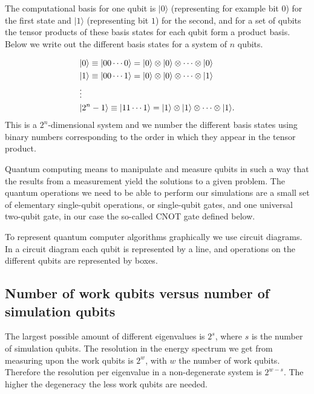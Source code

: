 \documentclass[%
oneside,                 %
final,                   %
10pt]{article}
\begin{document}
The computational basis for one qubit is ${\ensuremath{\vert 0 \rangle}}$ (representing for example bit $0$) 
for the first state
and ${\ensuremath{|1\rangle}}$ (representing bit $1$) for the second, and for a set of qubits  
the tensor products of
these basis states for each qubit form a product basis. Below we write out the different
basis states for a system of $n$ qubits.

\begin{align}
\label{eq:compBasis}
&{\ensuremath{\vert 0 \rangle}} \equiv {\ensuremath{\vert 00\cdots 0 \rangle}} =
      {\ensuremath{\vert 0 \rangle}} \otimes {\ensuremath{| 0 \rangle}} \otimes
          \cdots 
\otimes {\ensuremath{\vert 0 \rangle}} 
\notag \\
&{\ensuremath{|1\rangle}} \equiv {\ensuremath{\vert 00\cdots 1\rangle}} =
    {\ensuremath{\vert 0 \rangle}} \otimes {\ensuremath{| 0 \rangle}} \otimes
        \cdots 
\otimes {\ensuremath{|1\rangle}} 
\notag \\
&\vdots \notag \\
&{\ensuremath{|2^n-1\rangle}} \equiv {\ensuremath{|11\cdots 1\rangle}} =
    {\ensuremath{|1\rangle}} \otimes {\ensuremath{| 1\rangle}} \otimes 
\cdots \otimes {\ensuremath{|1 \rangle}}.
\notag \\
\end{align}
This is a $2^n$-dimensional system and we number the different basis
states using binary numbers corresponding to the order in which they appear in the
tensor product.

Quantum computing means to  manipulate and measure  qubits in such a
way that the results from a measurement yield the solutions to  a given problem. 
The quantum operations we need to be able to perform our simulations are 
a small set of elementary single-qubit
operations, or single-qubit gates, and one universal two-qubit gate,
in our case the so-called CNOT gate defined below.

To represent quantum computer algorithms graphically we use circuit
diagrams. In a circuit diagram each qubit is represented by a line,
and operations on the different qubits are represented by boxes.

\subsection{Number of work qubits versus number of simulation qubits}

The largest possible amount of different eigenvalues is $2^s$, where
$s$ is the number of simulation qubits. The resolution in the energy
spectrum we get from measuring upon the work qubits is $2^w$, with $w$ the number of
work qubits.
Therefore the resolution per eigenvalue in a non-degenerate system is
$2^{w-s}$. The higher the degeneracy the less work qubits are needed. 
\end{document}
